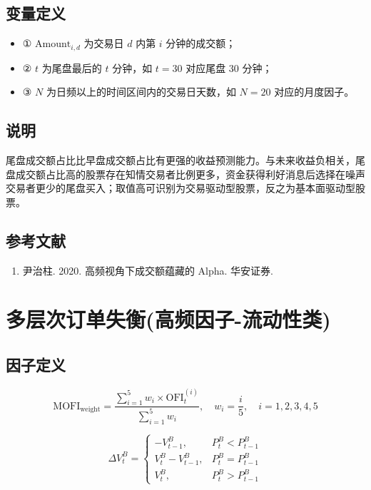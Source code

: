 \documentclass{article}
\begin{document}
\subsection{变量定义}
\begin{itemize}
    \item ① \( \mathrm{Amount}_{i,d} \) 为交易日 \( d \) 内第 \( i \) 分钟的成交额；
    \item ② \( t \) 为尾盘最后的 \( t \) 分钟，如 \( t=30 \) 对应尾盘 30 分钟；
    \item ③ \( N \) 为日频以上的时间区间内的交易日天数，如 \( N=20 \) 对应的月度因子。
\end{itemize}

\subsection{说明}
尾盘成交额占比比早盘成交额占比有更强的收益预测能力。与未来收益负相关，尾盘成交额占比高的股票存在知情交易者比例更多，资金获得利好消息后选择在噪声交易者更少的尾盘买入；取值高可识别为交易驱动型股票，反之为基本面驱动型股票。

\subsection{参考文献}
\begin{enumerate}
    \item 尹治柱. 2020. 高频视角下成交额蕴藏的 Alpha. 华安证券.
\end{enumerate}

\section{多层次订单失衡(高频因子-流动性类)}

\subsection{因子定义}

\begin{equation}
    \mathrm{MOFI}_{\mathrm{weight}} = \frac{\sum_{i=1}^{5} w_i \times \mathrm{OFI}_t^{(i)}}{\sum_{i=1}^{5} w_i}, \quad w_i = \frac{i}{5}, \quad i = 1, 2, 3, 4, 5
\end{equation}

\begin{equation}
    \Delta V_t^B = 
    \begin{cases} 
        -V_{t-1}^B, & P_t^B < P_{t-1}^B \\ 
        V_t^B - V_{t-1}^B, & P_t^B = P_{t-1}^B \\ 
        V_t^B, & P_t^B > P_{t-1}^B 
    \end{cases}
\end{equation}
\end{document}
